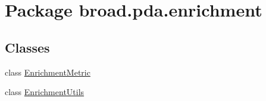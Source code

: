 \hypertarget{namespacebroad_1_1pda_1_1enrichment}{\section{Package broad.\+pda.\+enrichment}
\label{namespacebroad_1_1pda_1_1enrichment}
}
\subsection*{Classes}
\begin{DoxyCompactItemize}
\item 
class \hyperlink{classbroad_1_1pda_1_1enrichment_1_1_enrichment_metric}{Enrichment\+Metric}
\item 
class \hyperlink{classbroad_1_1pda_1_1enrichment_1_1_enrichment_utils}{Enrichment\+Utils}
\end{DoxyCompactItemize}
